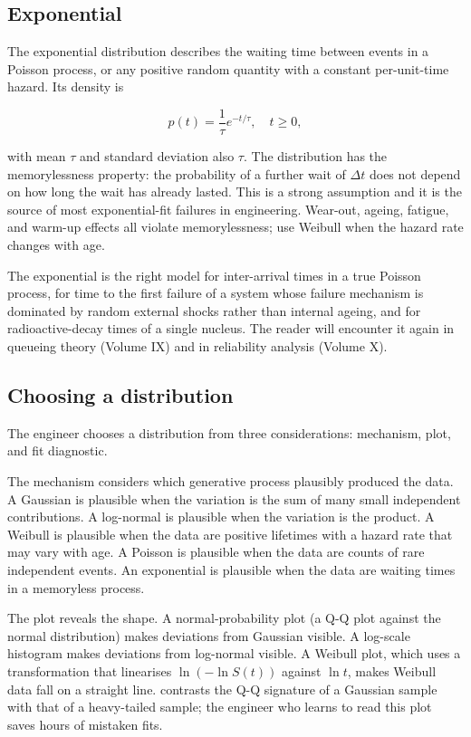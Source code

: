 \subsection{Exponential}

The exponential distribution describes the waiting time between
events in a Poisson process, or any positive random quantity with a
constant per-unit-time hazard. Its density is

\[
p(t) = \frac{1}{\tau} e^{-t/\tau}, \quad t \geq 0,
\]

with mean $\tau$ and standard deviation also $\tau$. The
distribution has the memorylessness property: the probability of a
further wait of $\Delta t$ does not depend on how long the wait has
already lasted. This is a strong assumption and it is the source of
most exponential-fit failures in engineering. Wear-out, ageing,
fatigue, and warm-up effects all violate memorylessness; use Weibull
when the hazard rate changes with age.

The exponential is the right model for inter-arrival times in a
true Poisson process, for time to the first failure of a system
whose failure mechanism is dominated by random external shocks
rather than internal ageing, and for radioactive-decay times of a
single nucleus. The reader will encounter it again in queueing
theory (Volume IX) and in reliability analysis (Volume X).

\subsection{Choosing a distribution}

The engineer chooses a distribution from three considerations:
mechanism, plot, and fit diagnostic.

The mechanism considers which generative process plausibly produced
the data. A Gaussian is plausible when the variation is the sum of
many small independent contributions. A log-normal is plausible when
the variation is the product. A Weibull is plausible when the data
are positive lifetimes with a hazard rate that may vary with age. A
Poisson is plausible when the data are counts of rare independent
events. An exponential is plausible when the data are waiting times
in a memoryless process.

The plot reveals the shape. A normal-probability plot (a Q-Q plot
against the normal distribution) makes deviations from Gaussian
visible. A log-scale histogram makes deviations from log-normal
visible. A Weibull plot, which uses a transformation that linearises
$\ln(-\ln S(t))$ against $\ln t$, makes Weibull data fall on a
straight line.  contrasts the Q-Q
signature of a Gaussian sample with that of a heavy-tailed sample;
the engineer who learns to read this plot saves hours of mistaken
fits.

